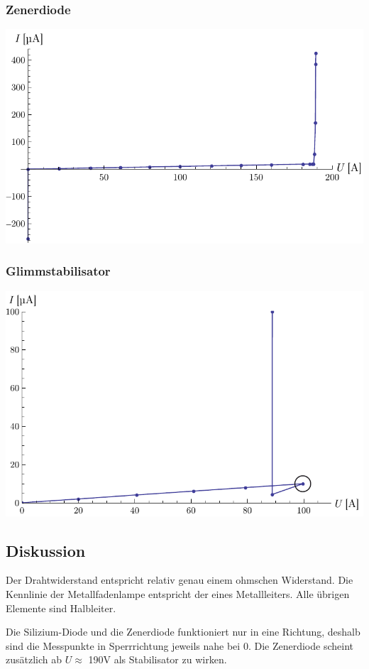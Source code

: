 \documentclass[12pt,a4paper]{article}
\begin{document}
\subsubsection*{Zenerdiode}
\includegraphics[width=14cm]{zenerdiode.pdf}

\subsubsection*{Glimmstabilisator}
\includegraphics[width=14cm]{glimmstabilisator.pdf}


\subsection*{Diskussion}
Der Drahtwiderstand entspricht relativ genau einem ohmschen Widerstand. Die Kennlinie der Metallfadenlampe entspricht der eines Metallleiters.
Alle \"ubrigen Elemente sind Halbleiter.

Die Silizium-Diode und die Zenerdiode funktioniert nur in eine Richtung, deshalb sind die Messpunkte in Sperrrichtung jeweils nahe bei 0. Die Zenerdiode scheint zus\"atzlich ab $U \approx $ 190V als Stabilisator zu wirken.
\end{document}
